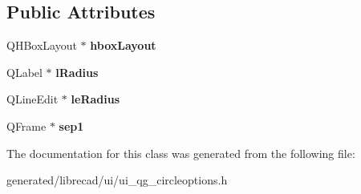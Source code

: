 \subsection*{Public Attributes}
\begin{DoxyCompactItemize}
\item 
\hypertarget{classUi__QG__CircleOptions_ae95282529708294633f0c38f70c4e493}{Q\-H\-Box\-Layout $\ast$ {\bfseries hbox\-Layout}}\label{classUi__QG__CircleOptions_ae95282529708294633f0c38f70c4e493}

\item 
\hypertarget{classUi__QG__CircleOptions_ad31e5a280ba579b6d4b76dc2dfc9a3ec}{Q\-Label $\ast$ {\bfseries l\-Radius}}\label{classUi__QG__CircleOptions_ad31e5a280ba579b6d4b76dc2dfc9a3ec}

\item 
\hypertarget{classUi__QG__CircleOptions_a122eed5f3c0ea35d7bfd384a9d17c8a5}{Q\-Line\-Edit $\ast$ {\bfseries le\-Radius}}\label{classUi__QG__CircleOptions_a122eed5f3c0ea35d7bfd384a9d17c8a5}

\item 
\hypertarget{classUi__QG__CircleOptions_a60f0e231a566733a7f6c47c7f561b2da}{Q\-Frame $\ast$ {\bfseries sep1}}\label{classUi__QG__CircleOptions_a60f0e231a566733a7f6c47c7f561b2da}

\end{DoxyCompactItemize}


The documentation for this class was generated from the following file\-:\begin{DoxyCompactItemize}
\item 
generated/librecad/ui/ui\-\_\-qg\-\_\-circleoptions.\-h\end{DoxyCompactItemize}
